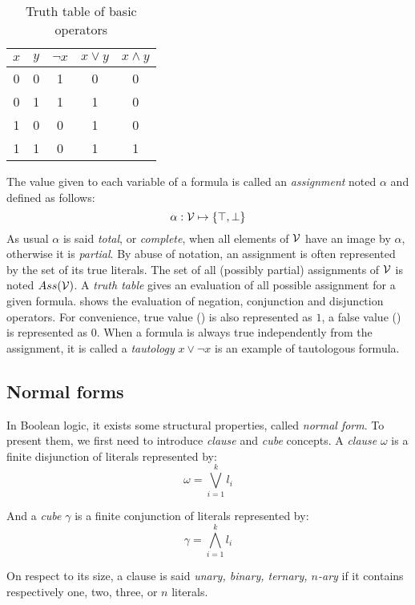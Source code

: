 \begin{table}[!htbp]
 \centering
 \begin{tabular}{cc|ccc}
  $x$ & $y$ & $\neg x$ & $x \lor y$ & $x \land y$ \\
  \toprule
  0 & 0 & 1 & 0 & 0 \\
  \midrule
  0 & 1 & 1 & 1 & 0 \\
  \midrule
  1 & 0 & 0 & 1 & 0 \\
  \midrule
  1 & 1 & 0 & 1 & 1 \\
  \bottomrule
 \end{tabular}
 \caption{Truth table of basic operators}
 \label{tab:truthtable}
\end{table}
The value given to each variable of a formula is called an \emph{assignment} noted $\alpha$ and defined as follows:
 $$\alpha: \mathcal{V} \mapsto \{ \top, \bot \}$$
 As usual $\alpha$ is said \emph{total}, or \emph{complete}, when all elements of $\mathcal{V}$ have an image by
$\alpha$, otherwise it is \emph{partial}. By abuse of notation, an assignment is
often represented by the set of its true literals.  The set of all (possibly
partial) assignments of $\mathcal{V}$ is noted $Ass(\mathcal{V})$.
A \emph{truth table} gives an evaluation of all possible assignment for a given formula.
 shows the evaluation of negation, conjunction and disjunction operators.
For convenience, true value (\true) is also represented as $1$, a false value (\false) is represented as $0$.
When a formula is always true independently from the assignment, it is called a \emph{tautology} $x \lor \neg x$ is 
an example of tautologous formula.

\subsection{Normal forms}
In Boolean logic, it exists some structural properties, called \emph{normal form}.
To present them, we first need to introduce \emph{clause} and \emph{cube} concepts.
A \emph{clause} $\omega$ is a finite disjunction of literals represented by:
 $$\omega = \bigvee_{i=1}^k l_i$$
 
 
And a \emph{cube} $\gamma$ is a finite conjunction of literals represented by:
$$\gamma = \bigwedge_{i=1}^k l_i$$

On respect to its size, a clause is said \emph{unary, binary, ternary, $n$-ary} if it contains respectively one, two, three, or $n$ literals.


